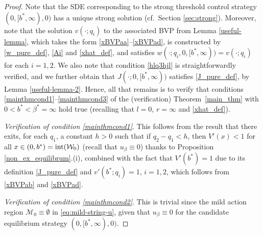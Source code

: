 \documentclass[11pt]{article} %
\numberwithin{komcounter}{section}
\begin{document}
\begin{proof} 
Note that the SDE corresponding to the strong threshold control strategy $(0,[b^*,\infty),0)$ has a unique strong solution (cf.~Section \ref{sec:strong}).
Moreover, note that the solution $v(\cdot;q_i)$ to the associated BVP from Lemma \ref{useful-lemma}, which takes the form \eqref{xBVPaa}--\eqref{xBVPad}, is constructed by \eqref{w_pure_def}, \eqref{Ai} and \eqref{xhat_def}, and satisfies $w(\cdot;q_i,0,[b^*,\infty)) = v(\cdot;q_i)$ for each $i=1,2$. 
We also note that condition \eqref{hlq3hjl} is straightforwardly verified, and we further obtain that $J(\cdot;0,[b^*,\infty))$ satisfies \eqref{J_pure_def}, by Lemma \ref{useful-lemma-2}. 
Hence, all that remains is to verify that conditions \eqref{mainthmcond1}--\eqref{mainthmcond3} of the (verification) Theorem~\ref{main_thm} with $0<b^*<\beta^*=\infty$  hold true (recalling that $l=0$, $r=\infty$ and \eqref{xhat_def}).

\vspace{1mm}
{\it Verification of condition \eqref{mainthmcond1}}. This follows from the result that there exits, for each $q_1$, a constant $h>0$ such that if $q_2-q_1 < h$, then $V'(x)<1$ for all $x\in(0,b^*)={\rm int}(\mathcal{W}_0)$ (recall that $u_\beta\equiv0$) thanks to Proposition \ref{non_ex_equilibrum}.(i), combined with the fact that $V'(b^*) = 1$ due to its definition \eqref{J_pure_def} and $v'(b^*;q_i) = 1$, $i=1,2$, which follows from \eqref{xBVPab} and \eqref{xBVPad}.

\vspace{1mm}
{\it Verification of condition \eqref{mainthmcond2}}. 
This is trivial since the mild action region $\mathcal{M}_0 \equiv \emptyset$ in \eqref{eq:mild-string-u}, given that $u_\beta \equiv 0$ for the candidate equilibrium strategy $(0,[b^*,\infty), 0)$. 


\end{proof}
\end{document}
